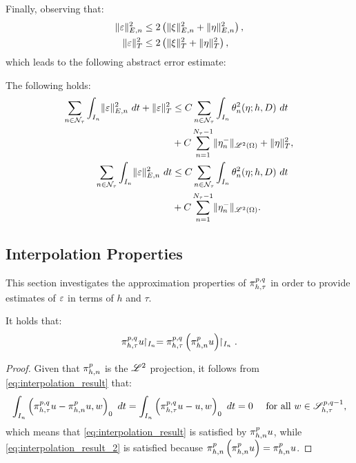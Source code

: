 Finally, observing that:
\begin{align}
    \lVert \varepsilon \rVert_{E, n}^2 &\leq 2 \left( \lVert \xi \rVert_{E, n}^2 + \lVert \eta \rVert_{E, n}^2 \right), \\
    \lVert \varepsilon \rVert_T^2 &\leq 2 \left( \lVert \xi \rVert_T^2 + \lVert \eta \rVert_T^2 \right),
\end{align}
which leads to the following abstract error estimate:
\begin{lemma} \label{lemma:abstract_estimates}
    The following holds:
    \begin{align}
        \sum_{n \in \mathcal{N}_{\tau}} \int_{I_n} \lVert \varepsilon \rVert_{E, n}^2 ~ dt + \lVert \varepsilon \rVert_T^2 &\leq C \sum_{n \in \mathcal{N}_{\tau}} \int_{I_n} \theta_n^2(\eta; h, D) ~ dt \\
        &+ C \sum_{n = 1}^{N_{\tau} - 1} \lVert \eta_n^- \rVert_{\mathscr{L}^{2}(\Omega)} + \lVert \eta \rVert_T^2, \notag \\ 
        \sum_{n \in \mathcal{N}_{\tau}} \int_{I_n} \lVert \varepsilon \rVert_{E, n}^2 ~ dt &\leq C \sum_{n \in \mathcal{N}_{\tau}} \int_{I_n} \theta_n^2(\eta; h, D) ~ dt \label{eq:abstract_estimates_2} \\
        &+ C \sum_{n = 1}^{N_{\tau} - 1} \lVert \eta_n^- \rVert_{\mathscr{L}^{2}(\Omega)}. \notag
    \end{align}
\end{lemma}


\newpage
\subsection{Interpolation Properties}

This section investigates the approximation properties of $\pi_{h, \tau}^{p, q}$ in order to provide estimates of $\varepsilon$ in terms of $h$ and $\tau$.

\begin{lemma}
    It holds that:
    \begin{align}
        \pi_{h, \tau}^{p, q} u \!\!\restriction_{I_n} = \pi_{h, \tau}^{p, q} \left( \pi_{h, n}^p u \right) \!\!\restriction_{I_n}.
    \end{align}
\end{lemma}

\begin{proof}
    Given that $\pi_{h, n}^p$ is the $\mathscr{L}^{2}$ projection, it follows from \cref{eq:interpolation_result} that:
    \begin{align*}
        \int_{I_n} \left( \pi_{h, \tau}^{p, q} u - \pi_{h, n}^p u, w \right)_0 ~ dt &= \int_{I_n} \left( \pi_{h, \tau}^{p, q} u - u, w \right)_0 ~ dt = 0 &\text{ for all } w \in \mathscr{S}^{p, q - 1}_{h, \tau},
    \end{align*}
    which means that \cref{eq:interpolation_result} is satisfied by $\pi_{h, n}^p u$, while \cref{eq:interpolation_result_2} is satisfied because $\pi_{h, n}^p \left( \pi_{h, n}^p u \right) = \pi_{h, n}^p u$.
\end{proof}

